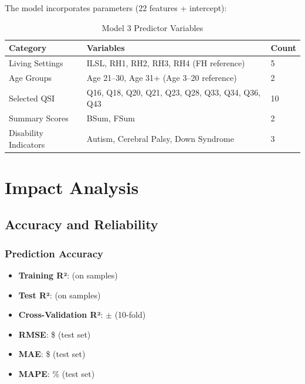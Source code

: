The model incorporates \ModelThreeParameters{} parameters (22 features + intercept):

\begin{table}[h]
\centering
\caption{Model 3 Predictor Variables}
\begin{tabular}{lll}
\toprule
\textbf{Category} & \textbf{Variables} & \textbf{Count} \\
\midrule
Living Settings & ILSL, RH1, RH2, RH3, RH4 (FH reference) & 5 \\
Age Groups & Age 21--30, Age 31+ (Age 3--20 reference) & 2 \\
Selected QSI & Q16, Q18, Q20, Q21, Q23, Q28, Q33, Q34, Q36, Q43 & 10 \\
Summary Scores & BSum, FSum & 2 \\
Disability Indicators & Autism, Cerebral Palsy, Down Syndrome & 3 \\
\bottomrule
\end{tabular}
\end{table}

\section{Impact Analysis}

\subsection{Accuracy and Reliability}

\subsubsection{Prediction Accuracy}

\begin{itemize}
    \item \textbf{Training R²}: \ModelThreeRSquaredTrain{} (on \ModelThreeTrainingSamples{} samples)
    \item \textbf{Test R²}: \ModelThreeRSquaredTest{} (on \ModelThreeTestSamples{} samples)
    \item \textbf{Cross-Validation R²}: \ModelThreeCVMean{} $\pm$ \ModelThreeCVStd{} (10-fold)
    \item \textbf{RMSE}: \$\ModelThreeRMSETest{} (test set)
    \item \textbf{MAE}: \$\ModelThreeMAETest{} (test set)
    \item \textbf{MAPE}: \ModelThreeMAPETest{}\% (test set)
\end{itemize}

